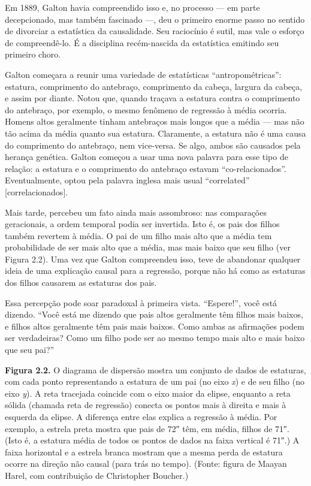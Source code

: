 \documentclass[11pt,a5paper,twoside]{book}
\begin{document}
Em 1889, Galton havia compreendido isso e, no processo — em parte decepcionado, mas também fascinado —, deu o primeiro enorme passo no sentido de divorciar a estatística da causalidade. Seu raciocínio é sutil, mas vale o esforço de compreendê-lo. É a disciplina recém-nascida da estatística emitindo seu primeiro choro.

Galton começara a reunir uma variedade de estatísticas “antropométricas”: estatura, comprimento do antebraço, comprimento da cabeça, largura da cabeça, e assim por diante. Notou que, quando traçava a estatura contra o comprimento do antebraço, por exemplo, o mesmo fenômeno de regressão à média ocorria. Homens altos geralmente tinham antebraços mais longos que a média — mas não tão acima da média quanto sua estatura. Claramente, a estatura não é uma causa do comprimento do antebraço, nem vice-versa. Se algo, ambos são causados pela herança genética. Galton começou a usar uma nova palavra para esse tipo de relação: a estatura e o comprimento do antebraço estavam “co-relacionados”. Eventualmente, optou pela palavra inglesa mais usual “correlated” [correlacionados].

Mais tarde, percebeu um fato ainda mais assombroso: nas comparações geracionais, a ordem temporal podia ser invertida. Isto é, os pais dos filhos também revertem à média. O pai de um filho mais alto que a média tem probabilidade de ser mais alto que a média, mas mais baixo que seu filho (ver Figura 2.2). Uma vez que Galton compreendeu isso, teve de abandonar qualquer ideia de uma explicação causal para a regressão, porque não há como as estaturas dos filhos causarem as estaturas dos pais.

Essa percepção pode soar paradoxal à primeira vista. “Espere!”, você está dizendo. “Você está me dizendo que pais altos geralmente têm filhos mais baixos, e filhos altos geralmente têm pais mais baixos. Como ambas as afirmações podem ser verdadeiras? Como um filho pode ser ao mesmo tempo mais alto e mais baixo que seu pai?”

\textbf{Figura 2.2.} O diagrama de dispersão mostra um conjunto de dados de estaturas, com cada ponto representando a estatura de um pai (no eixo \textit{x}) e de seu filho (no eixo \textit{y}). A reta tracejada coincide com o eixo maior da elipse, enquanto a reta sólida (chamada reta de regressão) conecta os pontos mais à direita e mais à esquerda da elipse. A diferença entre elas explica a regressão à média. Por exemplo, a estrela preta mostra que pais de 72″ têm, em média, filhos de 71″. (Isto é, a estatura média de todos os pontos de dados na faixa vertical é 71″.) A faixa horizontal e a estrela branca mostram que a mesma perda de estatura ocorre na direção não causal (para trás no tempo). (Fonte: figura de Maayan Harel, com contribuição de Christopher Boucher.)
\end{document}
